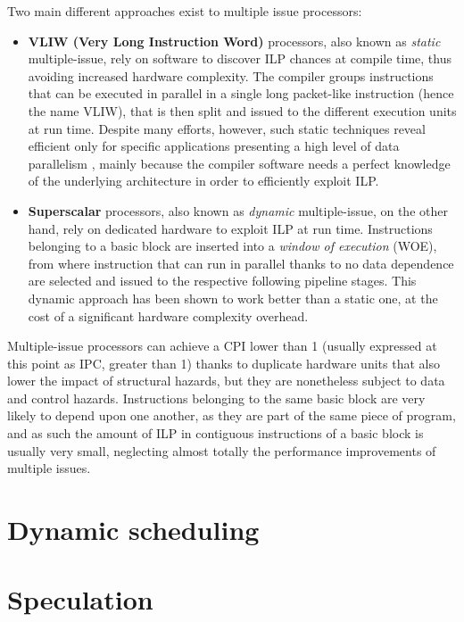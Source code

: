 Two main different approaches exist to multiple issue processors:
\begin{itemize}
  \item \textbf{VLIW (Very Long Instruction Word)} processors, also known as \emph{static} multiple-issue, rely on software to discover ILP chances at compile time, thus avoiding increased hardware complexity. The compiler groups instructions that can be executed in parallel in a single long packet-like instruction (hence the name VLIW), that is then split and issued to the different execution units at run time. Despite many efforts, however, such static techniques reveal efficient only for specific applications presenting a high level of data parallelism \cite[p.~168]{hennessy17}, mainly because the compiler software needs a perfect knowledge of the underlying architecture in order to efficiently exploit ILP.
  \item \textbf{Superscalar} processors, also known as \emph{dynamic} multiple-issue, on the other hand, rely on dedicated hardware to exploit ILP at run time. Instructions belonging to a basic block are inserted into a \emph{window of execution} (WOE), from where instruction that can run in parallel thanks to no data dependence are selected and issued to the respective following pipeline stages. This dynamic approach has been shown to work better than a static one, at the cost of a significant hardware complexity overhead.
\end{itemize}

Multiple-issue processors can achieve a CPI lower than 1 (usually expressed at this point as IPC, greater than 1) thanks to duplicate hardware units that also lower the impact of structural hazards, but they are nonetheless subject to data and control hazards. Instructions belonging to the same basic block are very likely to depend upon one another, as they are part of the same piece of program, and as such the amount of ILP in contiguous instructions of a basic block is usually very small, neglecting almost totally the performance improvements of multiple issues.

\section{Dynamic scheduling}

\section{Speculation}

